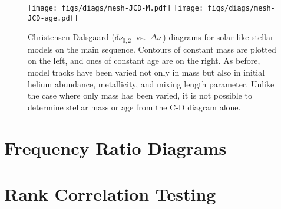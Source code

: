 \documentclass[a4paper,fleqn,usenatbib,useAMS]{mnras}
\newcommand{\Dnu}{\ensuremath{\Delta\nu \ }}
\newcommand{\dnu}{\ensuremath{\delta\nu_{0,2} \ }}
\newenvironment{rotatepage}%
    {\pagebreak[4]\global\pdfpageattr\expandafter{\the\pdfpageattr/Rotate 90}}%
    {\pagebreak[4]\global\pdfpageattr\expandafter{\the\pdfpageattr/Rotate 0}}%
\begin{document}
\begin{figure*}
\centering
\texttt{[image: figs/diags/mesh-JCD-M.pdf]}%
\texttt{[image: figs/diags/mesh-JCD-age.pdf]}%
\caption{Christensen-Dalsgaard ($\dnu$ vs.~$\Dnu$) diagrams for solar-like stellar models on the main sequence. Contours of constant mass are plotted on the left, and ones of constant age are on the right. As before, model tracks have been varied not only in mass but also in initial helium abundance, metallicity, and mixing length parameter. Unlike the case where only mass has been varied, it is not possible to determine stellar mass or age from the C-D diagram alone. } %
\label{fig:JCD-meshes}
\end{figure*}
%


\section{Frequency Ratio Diagrams}



\section{Rank Correlation Testing}
\end{document}
